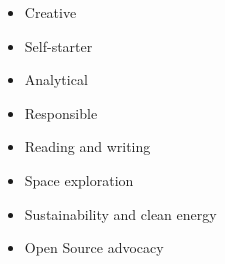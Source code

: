 %
%
%


\threecolumnsection
    {
            \begin{skills}
            \end{skills}
    }
    {
            \vspace{1em}
            \begin{itemize}
                \item Creative
                \item Self-starter
                \item Analytical
                \item Responsible
            \end{itemize}
    }
    {
            \vspace{1em}
            \begin{itemize}
                \item Reading and writing
                \item Space exploration
                \item Sustainability and clean energy
                \item Open Source advocacy
            \end{itemize}
    }
